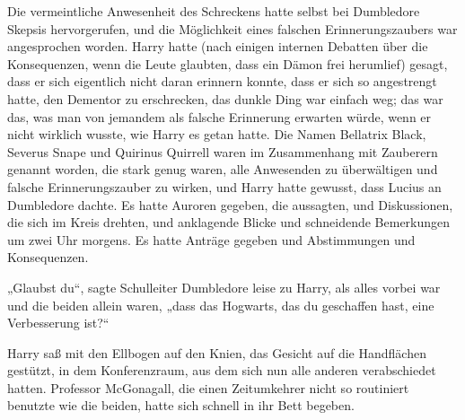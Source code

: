 Die vermeintliche Anwesenheit des Schreckens hatte selbst bei Dumbledore Skepsis hervorgerufen, und die Möglichkeit eines falschen Erinnerungszaubers war angesprochen worden. Harry hatte (nach einigen internen Debatten über die Konsequenzen, wenn die Leute glaubten, dass ein Dämon frei herumlief) gesagt, dass er sich eigentlich nicht daran erinnern konnte, dass er sich so angestrengt hatte, den Dementor zu erschrecken, das dunkle Ding war einfach weg; das war das, was man von jemandem als falsche Erinnerung erwarten würde, wenn er nicht wirklich wusste, wie Harry es getan hatte. Die Namen Bellatrix Black, Severus Snape und Quirinus Quirrell waren im Zusammenhang mit Zauberern genannt worden, die stark genug waren, alle Anwesenden zu überwältigen und falsche Erinnerungszauber zu wirken, und Harry hatte gewusst, dass Lucius an Dumbledore dachte. Es hatte Auroren gegeben, die aussagten, und Diskussionen, die sich im Kreis drehten, und anklagende Blicke und schneidende Bemerkungen um zwei Uhr morgens. Es hatte Anträge gegeben und Abstimmungen und Konsequenzen.

„Glaubst du“, sagte Schulleiter Dumbledore leise zu Harry, als alles vorbei war und die beiden allein waren, „dass das Hogwarts, das du geschaffen hast, eine Verbesserung ist?“

Harry saß mit den Ellbogen auf den Knien, das Gesicht auf die Handflächen gestützt, in dem Konferenzraum, aus dem sich nun alle anderen verabschiedet hatten.
Professor McGonagall, die einen Zeitumkehrer nicht so routiniert benutzte wie die beiden, hatte sich schnell in ihr Bett begeben.

